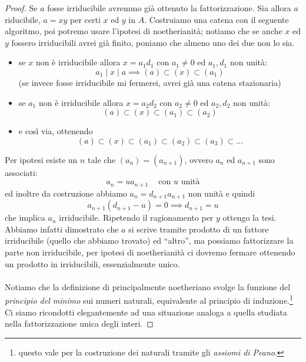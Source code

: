 \begin{proof}
	Se $a$ fosse irriducibile avremmo già ottenuto la fattorizzazione. Sia allora $a$ riducibile, $a=xy$ per certi $x$ ed $y$ in $A$. Costruiamo una catena con il seguente algoritmo, poi potremo usare l'ipotesi di noetherianità; notiamo che se anche $x$ ed $y$ fossero irriducibili avrei già finito, poniamo che almeno uno dei due non lo sia.
	\begin{itemize}
		\item se $x$ non è irriducibile allora $x=a_1d_1$ con $a_1 \neq 0$ ed $a_1,d_1$ non unità:
		\begin{equation*}
		a_1\mid x \mid a \implies (a)\subset(x)\subset(a_1)
		\end{equation*}
		(se invece fosse irriducibile mi fermerei, avrei già una catena stazionaria)
		\item se $a_1$ non è irriducibile allora $x=a_2d_2$ con $a_2 \neq 0$ ed $a_2,d_2$ non unità:
		\begin{equation*}
		(a)\subset(x)\subset(a_1)\subset(a_2)
		\end{equation*}
		\item e così via, ottenendo
		\begin{equation*}
		(a)\subset(x)\subset(a_1)\subset(a_2)\subset(a_3)\subset\dots
		\end{equation*}
	\end{itemize}
	Per ipotesi esiste un $n$ tale che $(a_n)=(a_{n+1})$, ovvero $a_{n}$ ed $a_{n+1}$ sono associati:
	\begin{equation*}
	a_{n}=ua_{n+1} \ \ \ \ \text{ con $u$ unità}
	\end{equation*}
	ed inoltre da costruzione abbiamo $a_{n}=d_{n+1}a_{n+1}$ non unità e quindi
	\begin{equation*}
	a_{n+1}(d_{n+1}-u)=0 \implies d_{n+1}=u
	\end{equation*}
	che implica $a_n$ irriducibile. Ripetendo il ragionamento per $y$ ottengo la tesi. \\ Abbiamo infatti dimostrato che $a$ si scrive tramite prodotto di un fattore irriducibile (quello che abbiamo trovato) ed \enquote{altro}, ma possiamo fattorizzare la parte non irriducibile, per ipotesi di noetherianità ci dovremo fermare ottenendo un prodotto in irriducibili, essenzialmente unico. \\ \\ Notiamo che la definizione di principalmente noetheriano svolge la funzione del \textit{principio del minimo} sui numeri naturali, equivalente al principio di induzione.\footnote{questo vale per la costruzione dei naturali tramite gli \textit{assiomi di Peano}.} Ci siamo ricondotti elegantemente ad una situazione analoga a quella studiata nella fattorizzazione unica degli interi.
\end{proof}
